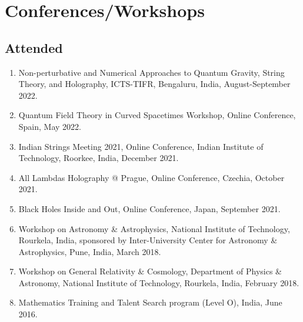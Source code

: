 \documentclass[11pt, letterpaper]{article}
\begin{document}
	\section{Conferences/Workshops}
	\subsection{Attended}
	\begin{enumerate}
		\item Non-perturbative and Numerical Approaches to Quantum Gravity, String Theory, and Holography, ICTS-TIFR, Bengaluru, India, August-September 2022.

		\item Quantum Field Theory in Curved Spacetimes Workshop, Online Conference, Spain, May 2022.

		\item Indian Strings Meeting 2021, Online Conference, Indian Institute of Technology, Roorkee, India, December 2021.

		\item All Lambdas Holography @ Prague, Online Conference, Czechia, October 2021.

		\item Black Holes Inside and Out, Online Conference, Japan, September 2021.

		\item Workshop on Astronomy \& Astrophysics, National Institute of Technology, Rourkela, India, sponsored by Inter-University Center for Astronomy \& Astrophysics, Pune, India, March 2018.

		\item Workshop on General Relativity \& Cosmology, Department of Physics \& Astronomy, National Institute of Technology, Rourkela, India, February 2018.

		\item Mathematics Training and Talent Search program (Level O), India, June 2016.
	\end{enumerate}
\end{document}
